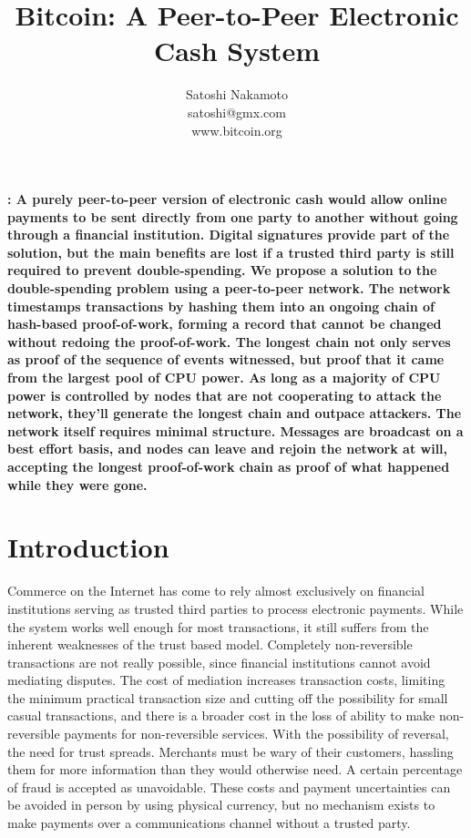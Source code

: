 \documentclass{article}
\title{Bitcoin: A Peer-to-Peer Electronic Cash System}
\author{Satoshi Nakamoto \\ satoshi@gmx.com \\ www.bitcoin.org}
\date{} %
\renewenvironment{abstract}{\noindent\bfseries\abstractname:\normalfont}{}
\begin{document}
\maketitle
\begin{abstract}
    A purely peer-to-peer version of electronic cash would allow online payments to be sent directly from one party to
    another without going through a financial institution.
    Digital signatures provide part of the solution,
    but the main benefits are lost if a trusted third party is still required to prevent double-spending.
    We propose a solution to the double-spending problem using a peer-to-peer network.
    The network timestamps transactions by hashing them into an ongoing chain of hash-based proof-of-work,
    forming a record that cannot be changed without redoing the proof-of-work.
    The longest chain not only serves as proof of the sequence of events witnessed,
    but proof that it came from the largest pool of CPU power.
    As long as a majority of CPU power is controlled by nodes that are not cooperating to attack the network,
    they'll generate the longest chain and outpace attackers.
    The network itself requires minimal structure.
    Messages are broadcast on a best effort basis,
    and nodes can leave and rejoin the network at will,
    accepting the longest proof-of-work chain as proof of what happened while they were gone.
\end{abstract}

\section{Introduction}\label{sec:introduction}
Commerce on the Internet has come to rely almost exclusively on financial institutions serving as
trusted third parties to process electronic payments.
While the system works well enough for most transactions, it still suffers from the inherent weaknesses of the trust based model.
Completely non-reversible transactions are not really possible, since financial institutions cannot
avoid mediating disputes.
The cost of mediation increases transaction costs, limiting the
minimum practical transaction size and cutting off the possibility for small casual transactions,
and there is a broader cost in the loss of ability to make non-reversible payments for non-reversible services.
With the possibility of reversal, the need for trust spreads.
Merchants must be wary of their customers, hassling them for more information than they would otherwise need.
A certain percentage of fraud is accepted as unavoidable.
These costs and payment uncertainties can be avoided in person by using physical currency, but no mechanism exists to make payments
over a communications channel without a trusted party.
\end{document}
